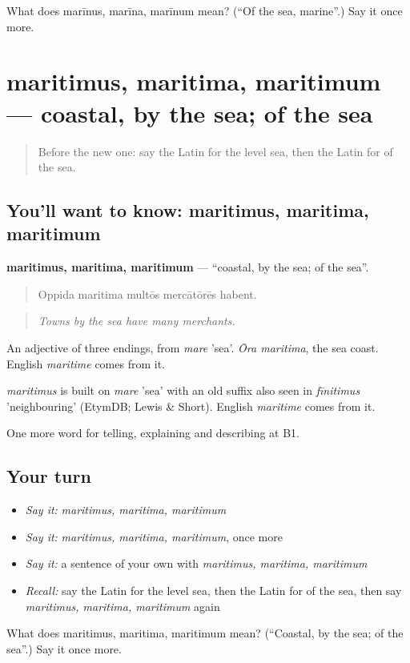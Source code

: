 \begin{tcolorbox}[breakable,colback=teal!4,colframe=teal!35!black,title={Before you move on}]
What does marīnus, marīna, marīnum mean? (\textquotedblleft{}Of the sea, marine\textquotedblright{}.) Say it once more.
\end{tcolorbox}
\section[maritimus, maritima, maritimum]{maritimus, maritima, maritimum — coastal, by the sea; of the sea}

\label{lesson:LA-C442-maritimus}



\begin{quote}
Before the new one: say the Latin for the level sea, then the Latin for of the sea.
\end{quote}

\subsection*{You'll want to know: maritimus, maritima, maritimum}
\textbf{maritimus, maritima, maritimum} — \textquotedblleft{}coastal, by the sea; of the sea\textquotedblright{}.

\begin{quote}
Oppida maritima multōs mercātōrēs habent.
\end{quote}

\begin{quote}
\emph{Towns by the sea have many merchants.}
\end{quote}

An adjective of three endings, from \emph{mare} 'sea'. \emph{Ōra maritima}, the sea coast. English \emph{maritime} comes from it.

\begin{cousinweb}
\emph{maritimus} is built on \emph{mare} 'sea' with an old suffix also seen in \emph{fīnitimus} 'neighbouring' (EtymDB; Lewis \& Short). English \emph{maritime} comes from it.
\end{cousinweb}

\begin{grammarlens}[title={What you've built}]
One more word for telling, explaining and describing at B1.
\end{grammarlens}

\subsection*{Your turn}
\begin{itemize}
\raggedright
  \item \emph{Say it:} \emph{maritimus, maritima, maritimum}
  \item \emph{Say it:} \emph{maritimus, maritima, maritimum}, once more
  \item \emph{Say it:} a sentence of your own with \emph{maritimus, maritima, maritimum}
  \item \emph{Recall:} say the Latin for the level sea, then the Latin for of the sea, then say \emph{maritimus, maritima, maritimum} again
\end{itemize}

\begin{tcolorbox}[breakable,colback=teal!4,colframe=teal!35!black,title={Before you move on}]
What does maritimus, maritima, maritimum mean? (\textquotedblleft{}Coastal, by the sea; of the sea\textquotedblright{}.) Say it once more.
\end{tcolorbox}
